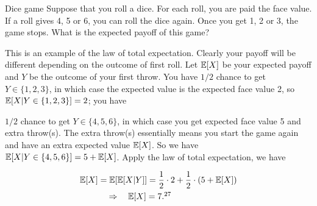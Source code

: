 \begin{problem}{Dice game}
Suppose that you roll a dice. For each roll, you are paid the face value. If a roll gives
4, 5 or 6, you can roll the dice again. Once you get 1, 2 or 3, the game stops. What is
the expected payoff of this game?

\end{problem}
\begin{solution}
This is an example of the law of total expectation. Clearly your payoff will be different
depending on the outcome of first roll. Let $\mathbb{E}[X]$ be your expected payoff and $Y$ be the
outcome of your first throw. You have $1/2$ chance to get $Y\in\{1,2,3\}$, in which case
the expected value is the expected face value 2, so $\mathbb{E}[X\vert Y\in\{1,2,3\}]=2$; you have


$1/2$ chance to get $Y\in\{4,5,6\}$, in which case you get expected face value 5 and
extra throw(s). The extra throw(s) essentially means you start the game again and have an
extra expected value $\mathbb{E}[X]$. So we have $\mathbb{E}[X\vert Y\in\{4,5,6\}]=5+\mathbb{E}[X]$. Apply the
law of total expectation, we have

\[
\begin{aligned}
\E[X]&=\E[\E[X\vert Y]]=\frac{1}{2}\cdot2+\frac{1}{2}\cdot(5+\E[X])\\
&\quad\Rightarrow\quad \E[X]=7.\footnotemark[27]
\end{aligned}
\]
\end{solution}

